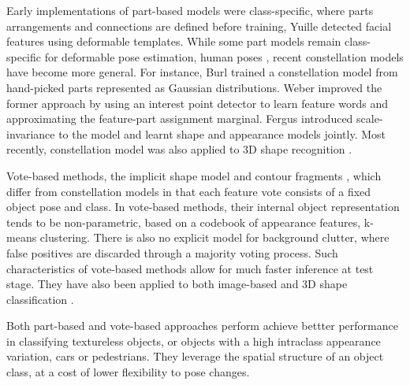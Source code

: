 Early implementations of part-based models were class-specific, where parts arrangements and connections are defined before training, \eg Yuille \etal detected facial features using deformable templates. While some part models remain class-specific for deformable pose estimation, \eg human poses \cite{Yang2011, Eichner2012}, recent constellation models have become more general. For instance, Burl \etal \cite{Burl1998} trained a constellation model from hand-picked parts represented as Gaussian distributions. Weber \etal \cite{Weber2000} improved the former approach by using an interest point detector \cite{Kadir2001} to learn feature words and approximating the feature-part assignment marginal. Fergus \etal \cite{Fergus2007} introduced scale-invariance to the model and learnt shape and appearance models jointly. Most recently, constellation model was also applied to 3D shape recognition \cite{MuktaPrasad2011}.

Vote-based methods, \eg the implicit shape model \cite{Leibe2008} and contour fragments \cite{Shotton2008a}, which differ from constellation models in that each feature vote consists of a fixed object pose and class. In vote-based methods, their internal object representation tends to be non-parametric, based on a codebook of appearance features, \eg k-means clustering. There is also no explicit model for background clutter, where false positives are discarded through a majority voting process. Such characteristics of vote-based methods allow for much faster inference at test stage. They have also been applied to both image-based \cite{Leibe2008, Shotton2008} and 3D shape classification \cite{Flitton2010,  Knopp2010, Pham2011, Barinova2010}.

Both part-based and vote-based approaches perform achieve bettter performance in classifying textureless objects, or objects with a high intraclass appearance variation, \eg cars or pedestrians. They leverage the spatial structure of an object class, at a cost of lower flexibility to pose changes.     




